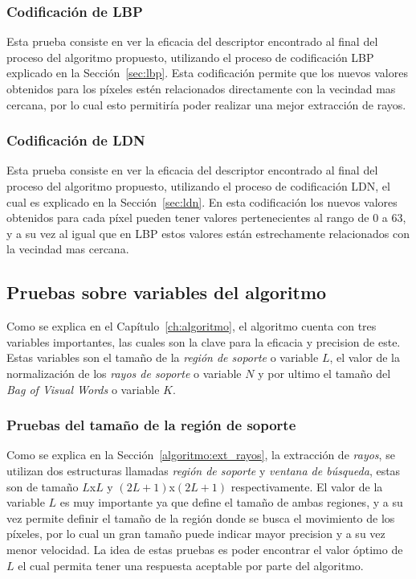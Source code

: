 	\subsubsection{Codificación de LBP}
	Esta prueba consiste en ver la eficacia del descriptor encontrado al final del proceso del algoritmo propuesto, utilizando el proceso de codificación LBP explicado en la Sección~\ref{sec:lbp}. Esta codificación permite que los nuevos valores obtenidos para los píxeles estén relacionados directamente con la vecindad mas cercana, por lo cual esto permitiría poder realizar una mejor extracción de rayos.
	
	\subsubsection{Codificación de LDN}
	Esta prueba consiste en ver la eficacia del descriptor encontrado al final del proceso del algoritmo propuesto, utilizando el proceso de codificación LDN, el cual es explicado en la Sección~\ref{sec:ldn}. En esta codificación los nuevos valores obtenidos para cada píxel pueden tener valores pertenecientes al rango de 0 a 63, y a su vez al igual que en LBP estos valores están estrechamente relacionados con la vecindad mas cercana.

\subsection{Pruebas sobre variables del algoritmo}
\label{exp:var}
Como se explica en el Capítulo~\ref{ch:algoritmo}, el algoritmo cuenta con tres variables importantes, las cuales son la clave para la eficacia y precision de este. Estas variables son el tamaño de la \textit{región de soporte} o variable $L$, el valor de la normalización de los \textit{rayos de soporte} o variable $N$ y por ultimo el tamaño del \textit{Bag of Visual Words} o variable $K$.

	\subsubsection{Pruebas del tamaño de la región de soporte}
	Como se explica en la Sección~\ref{algoritmo:ext_rayos}, la extracción de \textit{rayos}, se utilizan dos estructuras llamadas \textit{región de soporte} y \textit{ventana de búsqueda}, estas son de tamaño $L$x$L$ y $(2L+1)$x$(2L+1)$ respectivamente. El valor de la variable $L$ es muy importante ya que define el tamaño de ambas regiones, y a su vez permite definir el tamaño de la región donde se busca el movimiento de los píxeles, por lo cual un gran tamaño puede indicar mayor precision y a su vez menor velocidad. La idea de estas pruebas es poder encontrar el valor óptimo de $L$ el cual permita tener una respuesta aceptable por parte del algoritmo. 

